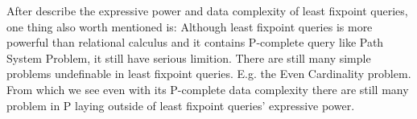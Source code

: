 After describe the expressive power and data complexity of least fixpoint queries, one thing also worth mentioned is: Although least fixpoint queries is more powerful than relational calculus and it contains P-complete query like Path System Problem, it still have serious limition. There are still many simple problems undefinable in least fixpoint queries. E.g. the Even Cardinality problem\cite{kolaitis1}. From which we see even with its P-complete data complexity there are still many problem in P laying outside of least fixpoint queries' expressive power.



